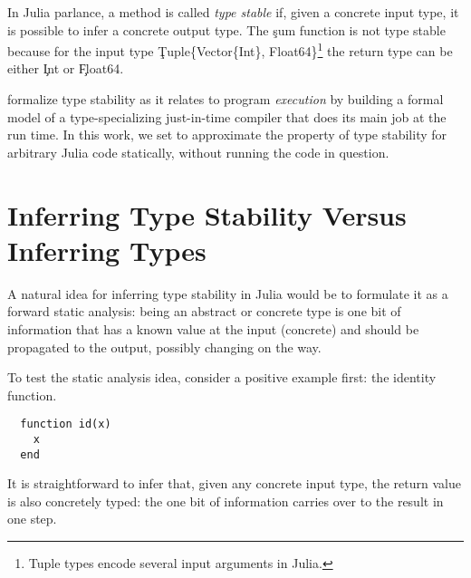 \documentclass[sigplan,review,anonymous]{acmart}
\begin{document}
In Julia parlance, a method is called \emph{type stable} if, given a concrete
input type, it is possible to infer a concrete output type. The \c{sum} function
is not type stable because for the input type \c{Tuple\{Vector\{Int\},
Float64\}}\footnote{Tuple types encode several input arguments in Julia.}
the return type can be either \c{Int} or \c{Float64}.

\citet{Pelenitsyn21} formalize type stability as it
relates to program \emph{execution} by building a formal model of a
type-specializing just-in-time compiler that does its main job at the run time.
In this work, we set to approximate the property of type stability for
arbitrary Julia code statically, without running the code in question.

\section{Inferring Type Stability Versus Inferring Types}%
\label{sec:arrive}

A natural idea for inferring type stability in Julia would be to formulate it as
a forward static analysis: being an abstract or concrete type is one bit of
information that has a known value at the input (concrete) and should be
propagated to the output, possibly changing on the way.

To test the static analysis idea, consider a positive example first: the
identity function.
\begin{verbatim}
  function id(x)
    x
  end
\end{verbatim}
%
It is straightforward to infer that, given any concrete input type, the return
value is also concretely typed: the one bit of information carries over to the
result in one step.
\end{document}
